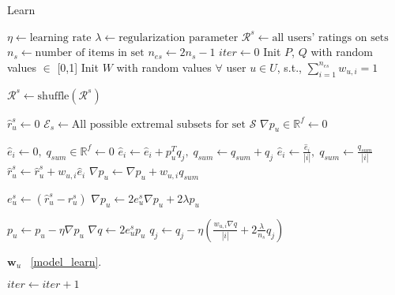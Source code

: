 \begin{algorithm}
  \caption{Learn \ES}
  \label{alg:alg-lfs-esarm}
  \begin{algorithmic}[1]
    \State $\eta \gets  \text{learning rate}$
    \State $\lambda \gets \text{regularization parameter}$
    \State $\mathcal{R}^s \gets \text{all users' ratings on sets}$  
    \State $n_s \gets \text{number of items in set}$
    \State $n_{es} \gets 2n_s - 1$ 
    \State $iter \gets 0$
    \State Init $P$, $Q$ with random values $\in$ [0,1] 
    \State Init $W$ with random values $\forall$ user $u \in U$, s.t.,
    $\sum_{i=1}^{n_{es}}w_{u,i}=1$
    
    

      \State $\mathcal{R}^s \gets \text{shuffle}(\mathcal{R}^s)$
      \State 
        
        \State $\hat{r}_{u}^s \gets 0$
        \State $\mathcal{E}_s \gets \text{All possible extremal subsets
        for set }\mathcal{S}$
        \State         
        \State $\nabla p_u \in \mathbb{R}^f \gets 0$ 
        
          \State $\hat{e}_i \gets 0,\; q_{sum} \in \mathbb{R}^f \gets 0$
            \State $\hat{e}_i \gets \hat{e}_i + p_u^Tq_j, \; q_{sum} \gets q_{sum} + q_j$
          \EndFor
          \State $\hat{e}_i \gets \frac{\hat{e}_i}{|i|},\; q_{sum} \gets \frac{q_{sum}}{|i|}$
          \State $\hat{r}_{u}^s \gets \hat{r}_{u}^s + w_{u,i}\hat{e}_i$
          \State $\nabla p_u \gets \nabla p_u + w_{u,i}q_{sum}$
        \EndFor
        
        \State $e_{u}^s \gets (\hat{r}_{u}^s - r_{u}^s)$
        \State $\nabla p_u \gets 2e_{u}^s\nabla p_u +
        2\lambda p_u$ 
 
        \State $p_u \gets p_u - \eta \nabla p_u$
        \State         
        \State $\nabla q \gets 2e_u^s p_u$
          \State $q_j \gets q_j - \eta (\frac{w_{u,i}{\nabla q} }{|i|} +
            2\frac{\lambda}{n_s}q_j)$  
          \EndFor  
        \EndFor

      \EndFor
      
      \State
        \State {} $\bm{w}_u$  
        \State {}~\ref{model_learn}. 
      \EndFor

      \State
      \State $iter \gets iter + 1$
    \EndWhile

    \EndProcedure
  \end{algorithmic}
\end{algorithm}


